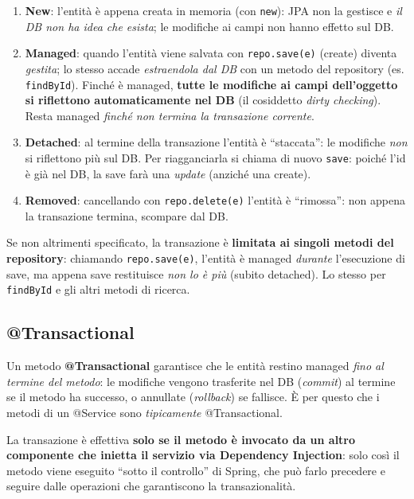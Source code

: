 \begin{importante}
\begin{enumerate}
  \item \textbf{New}: l'entit\`a \`e appena creata in memoria (con \texttt{new}): JPA non la
        gestisce e \emph{il DB non ha idea che esista}; le modifiche ai campi non hanno
        effetto sul DB.
  \item \textbf{Managed}: quando l'entit\`a viene salvata con \texttt{repo.save(e)} (create)
        diventa \emph{gestita}; lo stesso accade \emph{estraendola dal DB} con un metodo del
        repository (es. \texttt{findById}). Finch\'e \`e managed, \textbf{tutte le modifiche
        ai campi dell'oggetto si riflettono automaticamente nel DB} (il cosiddetto
        \emph{dirty checking}). Resta managed \emph{finch\'e non termina la transazione
        corrente}.
  \item \textbf{Detached}: al termine della transazione l'entit\`a \`e ``staccata'': le
        modifiche \emph{non} si riflettono pi\`u sul DB. Per riagganciarla si chiama di nuovo
        \texttt{save}: poich\'e l'id \`e gi\`a nel DB, la save far\`a una \emph{update}
        (anzich\'e una create).
  \item \textbf{Removed}: cancellando con \texttt{repo.delete(e)} l'entit\`a \`e ``rimossa'':
        non appena la transazione termina, scompare dal DB.
\end{enumerate}
\end{importante}

\begin{attenzione}
Se non altrimenti specificato, la transazione \`e \textbf{limitata ai singoli metodi del
repository}: chiamando \texttt{repo.save(e)}, l'entit\`a \`e managed \emph{durante}
l'esecuzione di save, ma appena save restituisce \emph{non lo \`e pi\`u} (subito detached).
Lo stesso per \texttt{findById} e gli altri metodi di ricerca.
\end{attenzione}

\subsection{@Transactional}
\begin{definizione}[@Transactional]
Un metodo \textbf{@Transactional} garantisce che le entit\`a restino managed \emph{fino al
termine del metodo}: le modifiche vengono trasferite nel DB (\emph{commit}) al termine se il
metodo ha successo, o annullate (\emph{rollback}) se fallisce. \`E per questo che i metodi di
un @Service sono \emph{tipicamente} @Transactional.
\end{definizione}
\begin{attenzione}
La transazione \`e effettiva \textbf{solo se il metodo \`e invocato da un altro componente
che inietta il servizio via Dependency Injection}: solo cos\`i il metodo viene eseguito
``sotto il controllo'' di Spring, che pu\`o farlo precedere e seguire dalle operazioni che
garantiscono la transazionalit\`a.
\end{attenzione}

